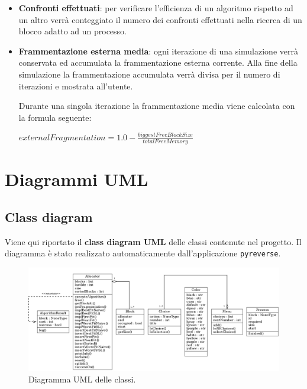 \documentclass[12pt]{report}
\renewcommand\emph{\textbf}
\begin{document}
        \begin{itemize}
            \item \emph{Confronti effettuati}: per verificare l'efficienza di un algoritmo rispetto ad un altro verrà conteggiato il numero dei confronti effettuati nella ricerca di un blocco adatto ad un processo.
            \item \emph{Frammentazione esterna media}: ogni iterazione di una simulazione verrà conservata ed accumulata la frammentazione esterna corrente. Alla fine della simulazione la frammentazione accumulata verrà divisa per il numero di iterazioni e mostrata all'utente.

            Durante una singola iterazione la frammentazione media viene calcolata con la formula seguente:

            $ externalFragmentation = 1.0 - \frac{biggestFreeBlockSize}{totalFreeMemory} $

        \end{itemize}

    \section{Diagrammi UML}

        \subsection{Class diagram}

            Viene qui riportato il \emph{class diagram UML} delle classi contenute nel progetto.
            Il diagramma è stato realizzato automaticamente dall'applicazione \texttt{pyreverse}.

            \begin{figure}[H]
                \caption{Diagramma UML delle classi.}
                \centering
                \includegraphics[width=1\textwidth]{diatemp}
            \end{figure}
\end{document}
